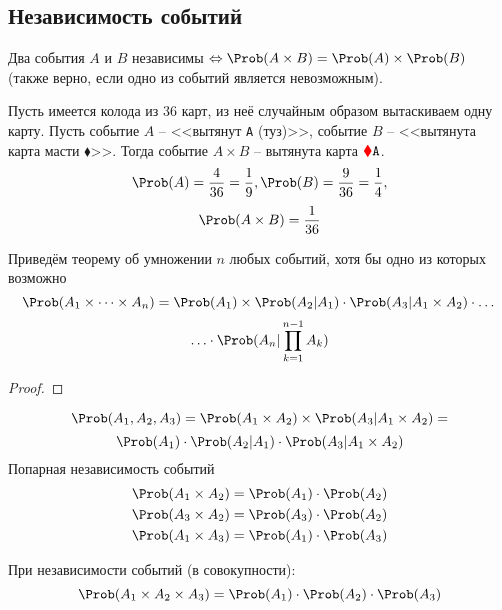 \subsection{Независимость событий}
\begin{definition}
	Два события $A$ и $B$ независимы $\Leftrightarrow \Prob(A \times B) = \Prob(A) \times \Prob(B)$ (также верно, если одно из событий является невозможным).
\end{definition}
\begin{example}
	Пусть имеется колода из 36 карт, из неё случайным образом вытаскиваем одну карту. Пусть событие $A$ -- <<вытянут \texttt{A} (туз)>>, событие $B$ -- <<вытянута карта масти {\color{red} $\blacklozenge$}>>. Тогда событие $A \times B$ -- вытянута карта ${\color{red} \blacklozenge} \texttt{A}$.
	\[
		\Prob(A) = \frac{4}{36} = \frac{1}{9}, \Prob(B) = \frac{9}{36} = \frac{1}{4},
	\]
	\[
		\Prob(A \times B) = \frac{1}{36}
	\]
\end{example}
Приведём теорему об умножении $n$ любых событий, хотя бы одно из которых возможно
\[
	\Prob(A_1 \times \dots \times A_n) = \Prob(A_1) \times \Prob(A_2|A_1) \cdot \Prob(A_3|A_1 \times A_2) \cdot \dots
\]
\[
	\ldots \cdot \Prob(A_n | \prod\limits_{k = 1}^{n-1} A_k)
\]
\begin{proof}

\end{proof}
\[
	\Prob(A_1, A_2, A_3) = \Prob(A_1 \times A_2) \times \Prob(A_3 | A_1 \times A_2) =
\]
\[
	\Prob(A_1) \cdot \Prob(A_2 | A_1) \cdot \Prob(A_3 | A_1 \times A_2)
\]
Попарная независимость событий
\begin{equation}\label{1-4-3}
	\begin{split}
		\Prob(A_1 \times A_2) = \Prob(A_1) \cdot \Prob(A_2) \\
		\Prob(A_3 \times A_2) = \Prob(A_3) \cdot \Prob(A_2) \\
		\Prob(A_1 \times A_3) = \Prob(A_1) \cdot \Prob(A_3) \\
	\end{split}
\end{equation}

При независимости событий (в совокупности):
\begin{equation}\label{1-4-4}
	\Prob(A_1 \times A_2 \times A_3) = \Prob(A_1) \cdot \Prob(A_2) \cdot \Prob(A_3)
\end{equation}
